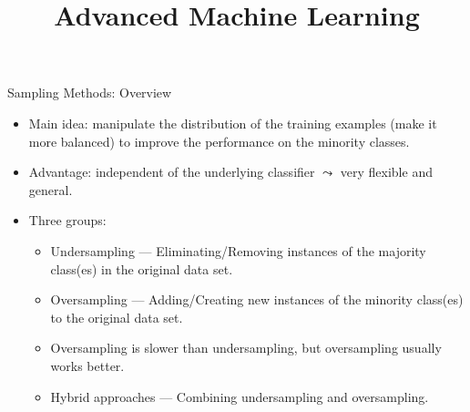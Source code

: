 \documentclass[11pt,compress,t,notes=noshow, xcolor=table]{beamer}
\title{Advanced Machine Learning}
\date{}
\begin{document}
	
	
	
	
	\sloppy
	
	
	
	\begin{frame}{Sampling Methods: Overview}
		\footnotesize
		\begin{itemize}

			\item Main idea: manipulate the distribution of the training examples (make it more balanced) to improve the performance on the minority classes.
			
			\item Advantage: independent of the underlying classifier $\leadsto$ very flexible and general.
   
			\item Three groups: 
            \vspace{10pt}
		
			\begin{minipage}{0.5\textwidth}
		
				\begin{itemize} 
                    \footnotesize
                    
					\item Undersampling --- Eliminating/Removing instances of the majority class(es) in the original data set.
                    \vspace{10pt}
			
					\item Oversampling --- Adding/Creating new instances of the minority class(es) to the original data set.
                    \vspace{10pt}

                    \item Oversampling is slower than undersampling, but oversampling usually works better.
                    \vspace{10pt}

					\item Hybrid approaches --- Combining undersampling and oversampling.
                    \vspace{10pt}
			
				\end{itemize}
		
			\end{minipage}
			\begin{minipage}{0.4\textwidth}
					\begin{figure}
					\centering
				\end{figure}
			\end{minipage}
	
		\end{itemize}
		
	\end{frame}
	
\end{document}
